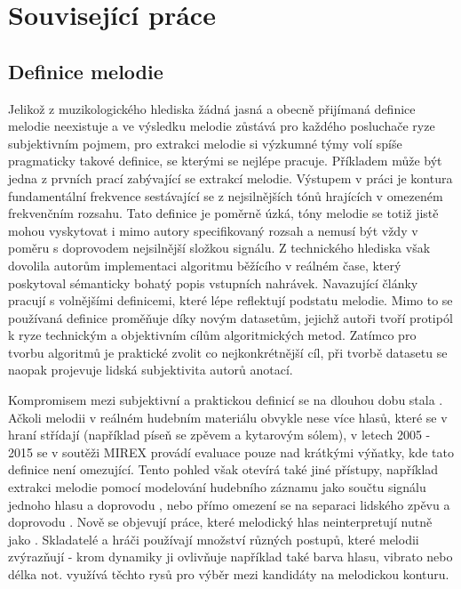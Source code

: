 \chapter{Související práce}

\section{Definice melodie}


Jelikož z muzikologického hlediska žádná jasná a obecně přijímaná definice melodie neexistuje a ve výsledku melodie zůstává pro každého posluchače ryze subjektivním pojmem, pro extrakci melodie si výzkumné týmy volí spíše pragmaticky takové definice, se kterými se nejlépe pracuje. Příkladem může být jedna z prvních prací zabývající se extrakcí melodie. Výstupem v práci \cite{Goto1999} je kontura fundamentální frekvence sestávající se z nejsilnějších tónů hrajících v omezeném frekvenčním rozsahu. Tato definice je poměrně úzká, tóny melodie se totiž jistě mohou vyskytovat i mimo autory specifikovaný rozsah a nemusí být vždy v poměru s doprovodem nejsilnější složkou signálu. Z technického hlediska však dovolila autorům implementaci algoritmu běžícího v reálném čase, který poskytoval sémanticky bohatý popis vstupních nahrávek. Navazující články pracují s volnějšími definicemi, které lépe reflektují podstatu melodie. Mimo to se používaná definice proměňuje díky novým datasetům, jejichž autoři tvoří protipól k ryze technickým a objektivním cílům algoritmických metod. Zatímco pro tvorbu algoritmů je praktické zvolit co nejkonkrétnější cíl, při tvorbě datasetu se naopak projevuje lidská subjektivita autorů anotací. 

Kompromisem mezi subjektivní a praktickou definicí se na dlouhou dobu stala . Ačkoli melodii v reálném hudebním materiálu obvykle nese více hlasů, které se v hraní střídají (například píseň se zpěvem a kytarovým sólem), v letech 2005 - 2015 se v soutěži MIREX provádí evaluace pouze nad krátkými výňatky, kde tato definice není omezující. Tento pohled však otevírá také jiné přístupy, například extrakci melodie pomocí modelování hudebního záznamu jako součtu signálu jednoho hlasu a doprovodu \citep{Durrieu2010}, \citep{Bosch2016b} nebo přímo omezení se na separaci lidského zpěvu a doprovodu \citep{Ikemiya2016}. Nově se objevují práce, které  melodický hlas neinterpretují nutně jako . Skladatelé a hráči používají množství různých postupů, které melodii zvýrazňují - krom dynamiky ji ovlivňuje například také barva hlasu, vibrato nebo délka not. \cite{Salamon2012a} využívá těchto rysů pro výběr mezi kandidáty na melodickou konturu.

